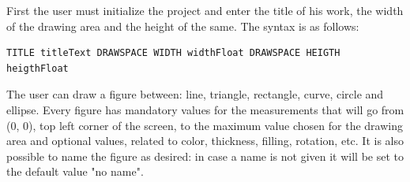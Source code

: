 \documentclass[a4paper]{article}
\begin{document}
First the user must initialize the project and enter the title of his work, the width of the drawing area and the height of the same. The syntax is as follows:
\vspace{1\baselineskip}
\begin{verbatim}
TITLE titleText DRAWSPACE WIDTH widthFloat DRAWSPACE HEIGTH heigthFloat
\end{verbatim}
\vspace{1\baselineskip}
The user can draw a figure between: line, triangle, rectangle, curve, circle and ellipse. Every figure has mandatory values for the measurements that will go from (0, 0), top left corner of the screen, to the maximum value chosen for the drawing area and optional values, related to color, thickness, filling, rotation, etc. It is also possible to name the figure as desired: in case a name is not given it will be set to the default value "no name".
\vspace{1\baselineskip}
\end{document}
